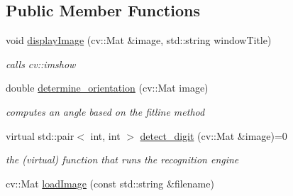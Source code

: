 \subsection*{Public Member Functions}
\begin{DoxyCompactItemize}
\item 
\mbox{\label{class_image_processing_1_1_character___recognition___algorithm_aa90c50ea0e11c37d117ebbb69d859cf1}} 
void \mbox{\hyperlink{class_image_processing_1_1_character___recognition___algorithm_aa90c50ea0e11c37d117ebbb69d859cf1}{display\+Image}} (cv\+::\+Mat \&image, std\+::string window\+Title)
\begin{DoxyCompactList}\small\item\em calls cv\+::imshow \end{DoxyCompactList}\item 
\mbox{\label{class_image_processing_1_1_character___recognition___algorithm_a7b42bfd91b6a9602106bc9445c880fda}} 
double \mbox{\hyperlink{class_image_processing_1_1_character___recognition___algorithm_a7b42bfd91b6a9602106bc9445c880fda}{determine\+\_\+orientation}} (cv\+::\+Mat image)
\begin{DoxyCompactList}\small\item\em computes an angle based on the fitline method \end{DoxyCompactList}\item 
\mbox{\label{class_image_processing_1_1_character___recognition___algorithm_a2ece422da371975b49273b8b7ea2e285}} 
virtual std\+::pair$<$ int, int $>$ \mbox{\hyperlink{class_image_processing_1_1_character___recognition___algorithm_a2ece422da371975b49273b8b7ea2e285}{detect\+\_\+digit}} (cv\+::\+Mat \&image)=0
\begin{DoxyCompactList}\small\item\em the (virtual) function that runs the recognition engine \end{DoxyCompactList}\item 
\mbox{\label{class_image_processing_1_1_character___recognition___algorithm_af251324381c75367abbc4a9d92eff4f9}} 
cv\+::\+Mat \mbox{\hyperlink{class_image_processing_1_1_character___recognition___algorithm_af251324381c75367abbc4a9d92eff4f9}{load\+Image}} (const std\+::string \&filename)

\end{DoxyCompactItemize}
